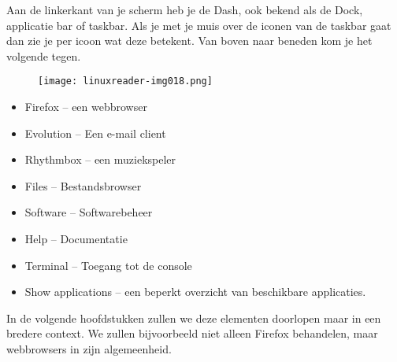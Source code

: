 Aan de linkerkant van je scherm heb je de Dash, ook bekend als de Dock, applicatie bar of taskbar. Als je met je muis over de iconen van de taskbar gaat dan zie je per icoon wat deze betekent. Van boven naar beneden kom je het volgende tegen.

\begin{figure}[H]
\texttt{[image: linuxreader-img018.png]}
\end{figure}
\begin{itemize}
\item Firefox -- een webbrowser
\item Evolution -- Een e-mail client
\item Rhythmbox -- een muziekspeler
\item Files -- Bestandsbrowser
\item Software -- Softwarebeheer
\item Help -- Documentatie
\item Terminal -- Toegang tot de console
\item Show applications -- een beperkt overzicht van beschikbare applicaties.
\end{itemize}

In de volgende hoofdstukken zullen we deze elementen doorlopen maar in een bredere context. We zullen bijvoorbeeld niet alleen Firefox behandelen, maar webbrowsers in zijn algemeenheid.

